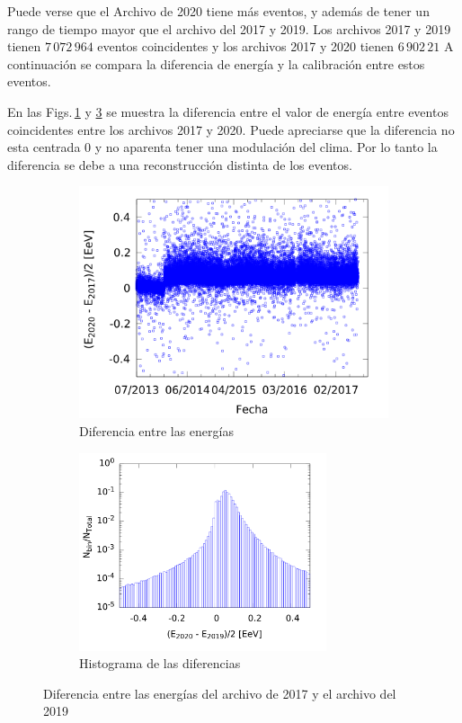 			Puede verse que el Archivo de 2020 tiene más eventos, y además de tener un rango de tiempo mayor que el archivo del 2017 y 2019. Los archivos 2017 y 2019  tienen $7\,072\,964$ eventos coincidentes y los archivos 2017 y 2020 tienen $6\,902\,21$ A continuación se compara la diferencia de energía y la calibración entre estos eventos.

			En las  Figs.\,\ref{fig:deltaE} y \ref{fig:histograma} se muestra la diferencia entre el valor de energía entre eventos coincidentes entre los archivos 2017 y 2020. Puede apreciarse que la diferencia no esta centrada 0 y no aparenta tener una modulación del clima. Por lo tanto la diferencia se debe a una reconstrucción distinta de los eventos.

					\begin{figure}[H]
						\begin{subfigure}[b]{0.5\textwidth}
							\centering
							\includegraphics[width=\textwidth]{comparacion_deltaE.png}
							\caption{Diferencia entre las energías} \label{fig:deltaE}
						\end{subfigure}%
						\begin{subfigure}[b]{0.5\textwidth}
							\centering
							\includegraphics[width=0.8\textwidth]{histograma_deltaE.png}
							\caption{Histograma de las diferencias} 	\label{fig:histograma}
						\end{subfigure}
						\caption{Diferencia entre las energías del archivo de 2017 y el archivo del 2019}
					\end{figure}

